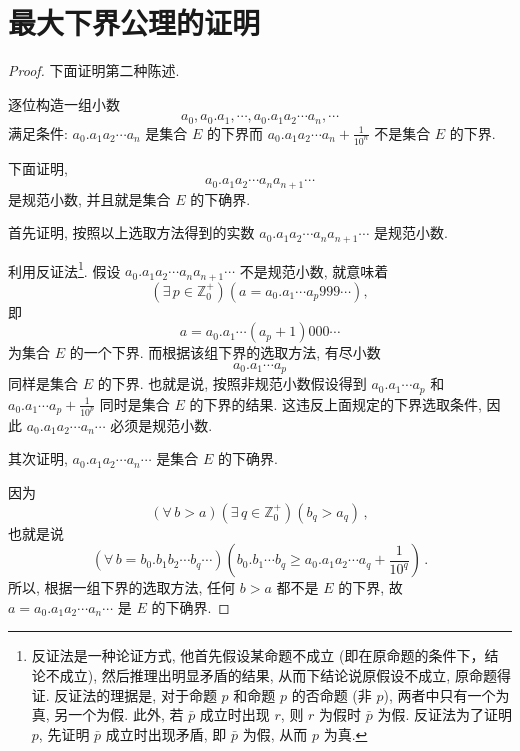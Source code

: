 \documentclass{book}
\newcommand{\Exists}{\exists\,}
\newcommand{\Any}{\forall\,}
\numberwithin{equation}{section}
\numberwithin{figure}{section}
\theoremstyle{definition}
\begin{document}
\section{最大下界公理的证明}
\label{proof:MaximalLowerBoundary}
\begin{proof}
  下面证明第二种陈述.

  逐位构造一组小数
  \begin{equation*}
    a_0,a_0.a_1,\cdots,a_0.a_1a_2\cdots a_n,\cdots
  \end{equation*}
  满足条件: $a_0.a_1a_2\cdots a_n$ 是集合 $E$ 的下界而 $a_0.a_1a_2\cdots a_n+\tfrac{1}{10^n}$ 不是集合 $E$ 的下界.

  下面证明,
  \begin{equation*}
    a_0.a_1a_2\cdots a_n a_{n+1}\cdots
  \end{equation*}
  是规范小数, 并且就是集合 $E$ 的下确界.

  首先证明, 按照以上选取方法得到的实数 $a_0.a_1a_2\cdots a_n a_{n+1}\cdots$ 是规范小数.

  利用反证法\footnote{反证法是一种论证方式, 他首先假设某命题不成立 (即在原命题的条件下，结论不成立), 然后推理出明显矛盾的结果, 从而下结论说原假设不成立, 原命题得证. 反证法的理据是, 对于命题 $p$ 和命题 $p$ 的否命题 (非 $p$), 两者中只有一个为真, 另一个为假. 此外, 若 $\bar{p}$ 成立时出现 $r$, 则 $r$ 为假时 $\bar{p}$ 为假. 反证法为了证明 $p$, 先证明 $\bar{p}$ 成立时出现矛盾, 即 $\bar{p}$ 为假, 从而 $p$ 为真.}. 假设 $a_0.a_1a_2\cdots a_n a_{n+1}\cdots$ 不是规范小数, 就意味着
  \begin{equation*}
    (\Exists p\in \mathbb{Z}_0^+)(a=a_0.a_1\cdots a_p 999\cdots),
  \end{equation*}
  即
  \begin{equation*}
    a=a_0.a_1\cdots (a_p+1)000\cdots
  \end{equation*}
  为集合 $E$ 的一个下界.
  而根据该组下界的选取方法, 有尽小数
  \begin{equation*}
    a_0.a_1\cdots a_p
  \end{equation*}
  同样是集合 $E$ 的下界. 也就是说, 按照非规范小数假设得到 $a_0.a_1\cdots a_p$ 和 $a_0.a_1\cdots a_p+\tfrac{1}{10^p}$ 同时是集合 $E$ 的下界的结果. 这违反上面规定的下界选取条件, 因此 $a_0.a_1a_2\cdots a_n\cdots$ 必须是规范小数.
  
  其次证明, $a_0.a_1a_2\cdots a_n\cdots$ 是集合 $E$ 的下确界.

  因为
  \begin{equation*}
    (\Any b>a)(\Exists q\in \mathbb{Z}_0^+)(b_q>a_q)\,,
  \end{equation*}
  也就是说
  \begin{equation*}
    (\Any b=b_0.b_1b_2\cdots b_q\cdots)(b_0.b_1\cdots b_q\geqslant a_0.a_1a_2\cdots a_q+\frac{1}{10^q})\,.
  \end{equation*}
  所以, 根据一组下界的选取方法, 任何 $b>a$ 都不是 $E$ 的下界, 故 $a=a_0.a_1a_2\cdots a_n\cdots$ 是 $E$ 的下确界.
\end{proof}
\end{document}
